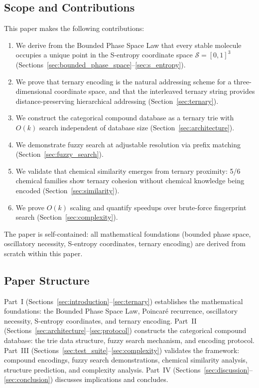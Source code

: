 \documentclass[11pt,twocolumn,a4paper]{article}
\theoremstyle{definition}
\theoremstyle{remark}
\newcommand{\Sspace}{\mathcal{S}}
\begin{document}
\subsection{Scope and Contributions}

This paper makes the following contributions:

\begin{enumerate}[nosep]
\item We derive from the Bounded Phase Space Law that every stable molecule occupies a unique point in the S-entropy coordinate space $\Sspace = [0,1]^3$ (Sections~\ref{sec:bounded_phase_space}--\ref{sec:s_entropy}).
\item We prove that ternary encoding is the natural addressing scheme for a three-dimensional coordinate space, and that the interleaved ternary string provides distance-preserving hierarchical addressing (Section~\ref{sec:ternary}).
\item We construct the categorical compound database as a ternary trie with $O(k)$ search independent of database size (Section~\ref{sec:architecture}).
\item We demonstrate fuzzy search at adjustable resolution via prefix matching (Section~\ref{sec:fuzzy_search}).
\item We validate that chemical similarity emerges from ternary proximity: 5/6 chemical families show ternary cohesion without chemical knowledge being encoded (Section~\ref{sec:similarity}).
\item We prove $O(k)$ scaling and quantify speedups over brute-force fingerprint search (Section~\ref{sec:complexity}).
\end{enumerate}

The paper is self-contained: all mathematical foundations (bounded phase space, oscillatory necessity, S-entropy coordinates, ternary encoding) are derived from scratch within this paper.

\subsection{Paper Structure}

Part~I (Sections~\ref{sec:introduction}--\ref{sec:ternary}) establishes the mathematical foundations: the Bounded Phase Space Law, Poincar\'e recurrence, oscillatory necessity, S-entropy coordinates, and ternary encoding. Part~II (Sections~\ref{sec:architecture}--\ref{sec:protocol}) constructs the categorical compound database: the trie data structure, fuzzy search mechanism, and encoding protocol. Part~III (Sections~\ref{sec:test_suite}--\ref{sec:complexity}) validates the framework: compound encodings, fuzzy search demonstrations, chemical similarity analysis, structure prediction, and complexity analysis. Part~IV (Sections~\ref{sec:discussion}--\ref{sec:conclusion}) discusses implications and concludes.
\end{document}
